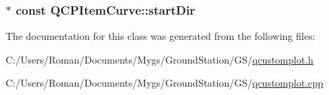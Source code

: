 \subsubsection[{start\+Dir}]{$\ast$ const Q\+C\+P\+Item\+Curve\+::start\+Dir}\label{class_q_c_p_item_curve_aa124bf66c09cc51c627fb49db8bf8a7b}


The documentation for this class was generated from the following files\+:\begin{DoxyCompactItemize}
\item 
C\+:/\+Users/\+Roman/\+Documents/\+Mygs/\+Ground\+Station/\+G\+S/\hyperlink{qcustomplot_8h}{qcustomplot.\+h}\item 
C\+:/\+Users/\+Roman/\+Documents/\+Mygs/\+Ground\+Station/\+G\+S/\hyperlink{qcustomplot_8cpp}{qcustomplot.\+cpp}\end{DoxyCompactItemize}
